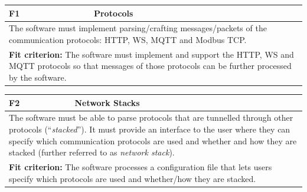 \begin{center}

    \begin{tabular}{|p{1cm}|p{12cm}|}
        \hline
        \textbf{F1} & \textbf{Protocols}                                                                                                                                                                                         \\ \hline
        \multicolumn{2}{|p{12cm}|}{The software must implement parsing/crafting messages/packets of the communication protocols: \ac{HTTP}\footnotemark, \ac{WS}, \ac{MQTT} and Modbus \ac{TCP}.}                                \\ \hline
        \multicolumn{2}{|p{12cm}|}{\textbf{Fit criterion:} The software must implement and support the \ac{HTTP}, \ac{WS} and \ac{MQTT} protocols so that messages of those protocols can be further processed by the software.} \\ \hline
    \end{tabular}
\end{center}
\begin{center}

    \begin{tabular}{|p{1cm}|p{12cm}|}
        \hline
        \textbf{F2} & \textbf{Network Stacks}                                                                                                                                                                                                                                                                                                      \\ \hline
        \multicolumn{2}{|p{12cm}|}{The software must be able to parse protocols that are tunnelled through other protocols (\enquote{\emph{stacked}}). It must provide an interface to the user where they can specify which communication protocols are used and whether and how they are stacked (further referred to as \emph{network stack}).} \\ \hline
        \multicolumn{2}{|p{12cm}|}{\textbf{Fit criterion:} The software processes a configuration file that lets users specify which protocols are used and whether/how they are stacked.}                                                                                                                                                         \\ \hline
    \end{tabular}
\end{center}
